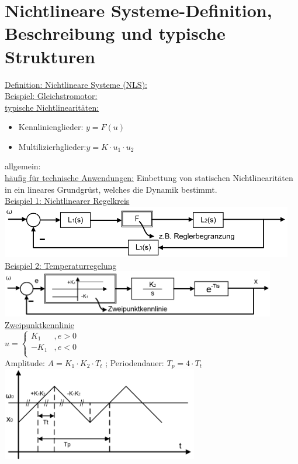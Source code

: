 \documentclass[openany,a4paper,11pt]{book}
\begin{document}
\section[Grundlagen]{Nichtlineare Systeme-Definition, Beschreibung und typische Strukturen}
\uline{Definition: Nichtlineare Systeme (NLS):}  \\
\uline{Beispiel: Gleichstromotor:}  \\
\uline{typische Nichtlinearitäten:}
\begin{itemize}
    \item Kennlinienglieder: $y=F(u)$  
    \item{Multilizierhglieder:$y=K \cdot u_1 \cdot u_2$}
\end{itemize}
allgemein: \\
\uline{häufig für technische Anwendungen:} Einbettung von statischen Nichtlinearitäten in ein lineares Grundgrüst, welches die Dynamik bestimmt.\\
\uline{Beispiel 1: Nichtlinearer Regelkreis}\\
\includegraphics[height=0.9in]{imgs/NLR1.png}\\
\uline{Beispiel 2: Temperaturregelung}\\
\includegraphics[height=0.8in]{imgs/NLR2.png}\\
\uline{Zweipunktkennlinie}\\
 $u = \left \{%
\begin{array}{lcrcl}
     K_1 & ,e>0 \\
     -K_1 & ,e<0 \\
\end{array} \right.$ \\
Amplitude:  $A=K_1\cdot K_2\cdot T_t $ ; Periodendauer: $T_p=4 \cdot T_t$ \\
\includegraphics[height=1.6in]{imgs/NLR3.png}\\
\end{document}
